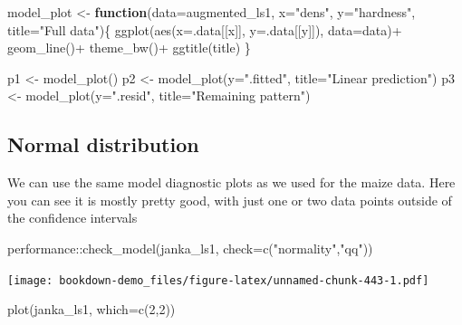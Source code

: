 \documentclass[
]{book}
\newenvironment{Shaded}{\begin{snugshade}}{\end{snugshade}}
\newcommand{\AttributeTok}[1]{\textcolor[rgb]{0.77,0.63,0.00}{#1}}
\newcommand{\ControlFlowTok}[1]{\textcolor[rgb]{0.13,0.29,0.53}{\textbf{#1}}}
\newcommand{\DecValTok}[1]{\textcolor[rgb]{0.00,0.00,0.81}{#1}}
\newcommand{\FunctionTok}[1]{\textcolor[rgb]{0.00,0.00,0.00}{#1}}
\newcommand{\NormalTok}[1]{#1}
\newcommand{\OtherTok}[1]{\textcolor[rgb]{0.56,0.35,0.01}{#1}}
\newcommand{\SpecialCharTok}[1]{\textcolor[rgb]{0.00,0.00,0.00}{#1}}
\newcommand{\StringTok}[1]{\textcolor[rgb]{0.31,0.60,0.02}{#1}}
\begin{document}
\begin{Shaded}
\begin{Highlighting}[]
\NormalTok{model\_plot }\OtherTok{\textless{}{-}} \ControlFlowTok{function}\NormalTok{(}\AttributeTok{data=}\NormalTok{augmented\_ls1, }\AttributeTok{x=}\StringTok{"dens"}\NormalTok{, }\AttributeTok{y=}\StringTok{"hardness"}\NormalTok{, }\AttributeTok{title=}\StringTok{"Full data"}\NormalTok{)\{}
  \FunctionTok{ggplot}\NormalTok{(}\FunctionTok{aes}\NormalTok{(}\AttributeTok{x=}\NormalTok{.data[[x]], }\AttributeTok{y=}\NormalTok{.data[[y]]), }\AttributeTok{data=}\NormalTok{data)}\SpecialCharTok{+}
  \FunctionTok{geom\_line}\NormalTok{()}\SpecialCharTok{+}
    \FunctionTok{theme\_bw}\NormalTok{()}\SpecialCharTok{+}
      \FunctionTok{ggtitle}\NormalTok{(title)}
\NormalTok{\}}

\NormalTok{p1 }\OtherTok{\textless{}{-}} \FunctionTok{model\_plot}\NormalTok{()}
\NormalTok{p2 }\OtherTok{\textless{}{-}} \FunctionTok{model\_plot}\NormalTok{(}\AttributeTok{y=}\StringTok{".fitted"}\NormalTok{, }\AttributeTok{title=}\StringTok{"Linear prediction"}\NormalTok{)}
\NormalTok{p3 }\OtherTok{\textless{}{-}} \FunctionTok{model\_plot}\NormalTok{(}\AttributeTok{y=}\StringTok{".resid"}\NormalTok{, }\AttributeTok{title=}\StringTok{"Remaining pattern"}\NormalTok{)}
\end{Highlighting}
\end{Shaded}

\hypertarget{normal-distribution-2}{%
\subsection{Normal distribution}\label{normal-distribution-2}}

We can use the same model diagnostic plots as we used for the maize data.
Here you can see it is mostly pretty good, with just one or two data points outside of the confidence intervals

\begin{Shaded}
\begin{Highlighting}[]
\NormalTok{performance}\SpecialCharTok{::}\FunctionTok{check\_model}\NormalTok{(janka\_ls1, }\AttributeTok{check=}\FunctionTok{c}\NormalTok{(}\StringTok{"normality"}\NormalTok{,}\StringTok{"qq"}\NormalTok{))}
\end{Highlighting}
\end{Shaded}

\texttt{[image: bookdown-demo\_files/figure-latex/unnamed-chunk-443-1.pdf]}

\begin{Shaded}
\begin{Highlighting}[]
\FunctionTok{plot}\NormalTok{(janka\_ls1, }\AttributeTok{which=}\FunctionTok{c}\NormalTok{(}\DecValTok{2}\NormalTok{,}\DecValTok{2}\NormalTok{))}
\end{Highlighting}
\end{Shaded}
\end{document}

